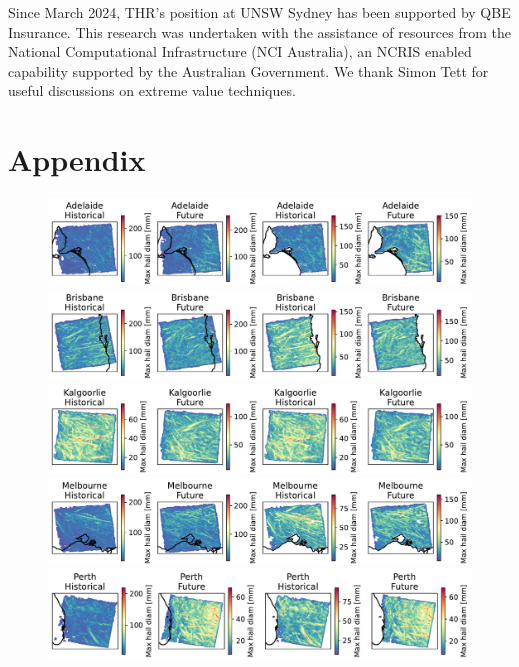\documentclass[]{agujournal2019}\usepackage[]{graphicx}\usepackage[]{xcolor}
\begin{document}
\acknowledgments

Since March 2024, THR's position at UNSW Sydney has been supported by QBE Insurance. This research was undertaken with the assistance of resources from the National Computational Infrastructure (NCI Australia), an NCRIS enabled capability supported by the Australian Government. We thank Simon Tett for useful discussions on extreme value techniques.



\newpage
\appendix
\setcounter{figure}{0}
\renewcommand{\thefigure}{A\arabic{figure}}

\section*{Appendix}

\begin{figure}[!ht]
      \includegraphics[width=\textwidth]{figures/maxes_Adelaide_hailcast_diam_max}
      \includegraphics[width=\textwidth]{figures/maxes_Brisbane_hailcast_diam_max}
      \includegraphics[width=\textwidth]{figures/maxes_Kalgoorlie_hailcast_diam_max}
      \includegraphics[width=\textwidth]{figures/maxes_Melbourne_hailcast_diam_max}
      \includegraphics[width=\textwidth]{figures/maxes_Perth_hailcast_diam_max}

\end{figure}
\end{document}

